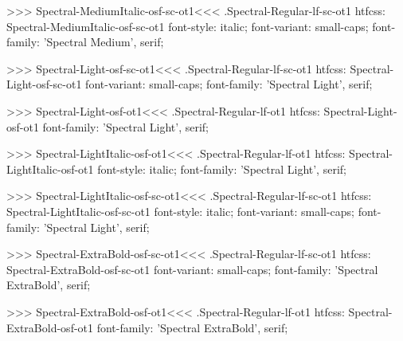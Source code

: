 >>>
\<Spectral-MediumItalic-osf-sc-ot1\><<<
.Spectral-Regular-lf-sc-ot1
htfcss:  Spectral-MediumItalic-osf-sc-ot1  font-style: italic; font-variant: small-caps; font-family: 'Spectral Medium', serif;

>>>
\<Spectral-Light-osf-sc-ot1\><<<
.Spectral-Regular-lf-sc-ot1
htfcss:  Spectral-Light-osf-sc-ot1  font-variant: small-caps; font-family: 'Spectral Light', serif;

>>>
\<Spectral-Light-osf-ot1\><<<
.Spectral-Regular-lf-ot1
htfcss:  Spectral-Light-osf-ot1  font-family: 'Spectral Light', serif;

>>>
\<Spectral-LightItalic-osf-ot1\><<<
.Spectral-Regular-lf-ot1
htfcss:  Spectral-LightItalic-osf-ot1  font-style: italic; font-family: 'Spectral Light', serif;

>>>
\<Spectral-LightItalic-osf-sc-ot1\><<<
.Spectral-Regular-lf-sc-ot1
htfcss:  Spectral-LightItalic-osf-sc-ot1  font-style: italic; font-variant: small-caps; font-family: 'Spectral Light', serif;

>>>
\<Spectral-ExtraBold-osf-sc-ot1\><<<
.Spectral-Regular-lf-sc-ot1
htfcss:  Spectral-ExtraBold-osf-sc-ot1  font-variant: small-caps; font-family: 'Spectral ExtraBold', serif;

>>>
\<Spectral-ExtraBold-osf-ot1\><<<
.Spectral-Regular-lf-ot1
htfcss:  Spectral-ExtraBold-osf-ot1  font-family: 'Spectral ExtraBold', serif;

